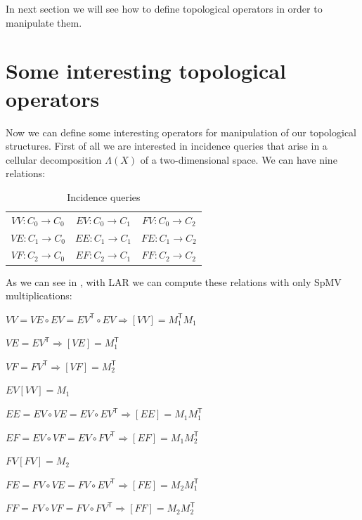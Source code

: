 In next section we will see how to define topological operators in order to manipulate them.

\section{Some interesting topological operators}\label{sec21:topologicalOperators}

Now we can define some interesting operators for manipulation of our topological structures. First of all we are interested in incidence queries that arise in a cellular decomposition $\Lambda(X)$ of a two-dimensional space. We can have nine relations:

\begin{table}[htbp]
\centering
\caption[Incidence queries]{Incidence queries}
\label{tbl:incidence}
\begin{tabular}{ccc}
$VV \colon C_{0} \rightarrow C_{0}$	&$EV \colon C_{0} \rightarrow C_{1}$	&$FV \colon C_{0} \rightarrow C_{2}$\\ 
$VE \colon C_{1} \rightarrow C_{0}$	&$EE \colon C_{1} \rightarrow C_{1}$	&$FE \colon C_{1} \rightarrow C_{2}$\\
$VF \colon C_{2} \rightarrow C_{0}$	&$EF \colon C_{2} \rightarrow C_{1}$	&$FF \colon C_{2} \rightarrow C_{2}$\\
\end{tabular}
\end{table}

As we can see in \cite{DiCarlo}, with LAR we can compute these relations with only SpMV multiplications:
\begin{description}
 \item $VV = VE \circ EV = EV^{\mathsf{T}} \circ EV \Rightarrow [VV] = M_{1}^{\mathsf{T}}M_{1}$
 \item $VE = EV^{\mathsf{T}} \Rightarrow [VE] = M_{1}^{\mathsf{T}}$ 
 \item $VF = FV^{\mathsf{T}} \Rightarrow [VF] = M_{2}^{\mathsf{T}}$ 
 \item $EV [VV] = M_{1}$ 
 \item $EE = EV \circ VE = EV \circ EV^{\mathsf{T}} \Rightarrow [EE] = M_{1}M_{1}^{\mathsf{T}}$ 
 \item $EF = EV \circ VF = EV \circ FV^{\mathsf{T}} \Rightarrow [EF] = M_{1}M_{2}^{\mathsf{T}}$ 
 \item $FV [FV] = M_{2}$ 
 \item $FE = FV \circ VE = FV \circ EV^{\mathsf{T}} \Rightarrow [FE] = M_{2}M_{1}^{\mathsf{T}}$ 
 \item $FF = FV \circ VF = FV \circ FV^{\mathsf{T}} \Rightarrow [FF] = M_{2}M_{2}^{\mathsf{T}}$ 
\end{description}

